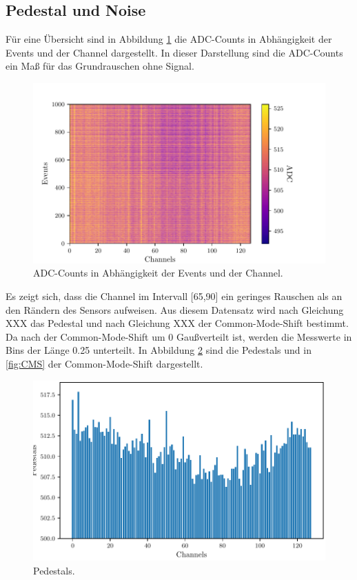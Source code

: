 \subsection{Pedestal und Noise}
Für eine Übersicht sind in Abbildung \ref{fig:ADC} die ADC-Counts in Abhängigkeit der Events und der Channel dargestellt. In dieser Darstellung sind die ADC-Counts ein Maß für das Grundrauschen ohne Signal. 

\begin{figure}[H]
  \centering
  \includegraphics{build/ADC.pdf}
  \caption{ADC-Counts in Abhängigkeit der Events und der Channel.}
  \label{fig:ADC}
\end{figure}


Es zeigt sich, dass die Channel im Intervall [65,90] ein geringes Rauschen als an den Rändern des Sensors aufweisen. Aus diesem Datensatz wird nach Gleichung XXX das Pedestal und nach Gleichung XXX der Common-Mode-Shift bestimmt. Da nach \cite{skript} der Common-Mode-Shift um 0 Gaußverteilt ist, werden die Messwerte in Bins der Länge 0.25 unterteilt. In Abbildung \ref{fig:pedestals} sind die Pedestals und in \ref{fig:CMS} der Common-Mode-Shift dargestellt. 

\begin{figure}[H]
  \centering
  \includegraphics{build/Pedestals.pdf}
  \caption{Pedestals.}
  \label{fig:pedestals}
\end{figure}

